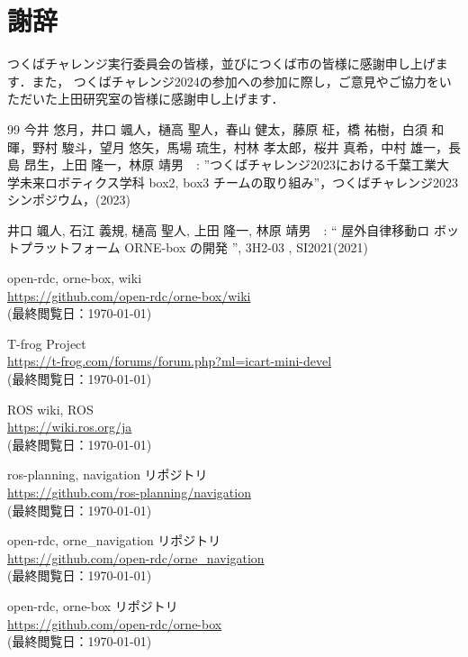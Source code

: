 \documentclass[twocolumn, 9pt]{jsproceedings}
\begin{document}
\vspace*{12.3mm}


\section*{謝辞}
つくばチャレンジ実行委員会の皆様，並びにつくば市の皆様に感謝申し上げます．また，
つくばチャレンジ2024の参加への参加に際し，ご意見やご協力をいただいた上田研究室の皆様に感謝申し上げます．

\newpage

\footnotesize
\begin{thebibliography}{99}
  今井 悠月，井口 颯人，樋高 聖人，春山 健太，藤原 柾，橋 祐樹，白須 和暉，野村 駿斗，望月 悠矢，馬場 琉生，村林 孝太郎，桜井 真希，中村 雄一，長島 昂生，上田 隆一，林原 靖男　: 
  ”つくばチャレンジ2023における千葉工業大学未来ロボティクス学科 box2, box3 チームの取り組み”，つくばチャレンジ2023シンポジウム，(2023)

井口 颯人, 石江 義規, 樋高 聖人, 上田 隆一, 林原 靖男　: “ 屋外自律移動ロ
ボットプラットフォーム ORNE-box の開発 ”, 3H2-03 , SI2021(2021)

open-rdc, orne-box, wiki\\
\url{https://github.com/open-rdc/orne-box/wiki}\\
(最終閲覧日：\today)

T-frog Project\\
\url{https://t-frog.com/forums/forum.php?ml=icart-mini-devel}\\
(最終閲覧日：\today)

ROS wiki, ROS\\
\url{https://wiki.ros.org/ja}\\
(最終閲覧日：\today)

ros-planning, navigation リポジトリ\\
\url{https://github.com/ros-planning/navigation}\\
(最終閲覧日：\today)

open-rdc, orne\_navigation リポジトリ\\
\url{https://github.com/open-rdc/orne_navigation}\\
(最終閲覧日：\today)

open-rdc, orne-box リポジトリ\\
\url{https://github.com/open-rdc/orne-box}\\
(最終閲覧日：\today)


\end{thebibliography}
\end{document}
